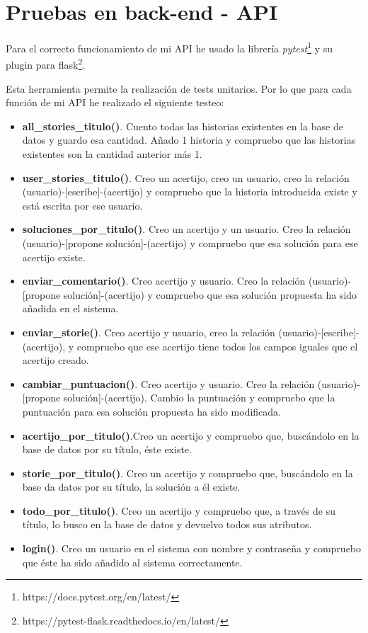 \section{Pruebas en back-end - API}

Para el correcto funcionamiento de mi API he usado la librería \textit{pytest}\footnote{https://docs.pytest.org/en/latest/} y su plugin para flask\footnote{https://pytest-flask.readthedocs.io/en/latest/}.

Esta herramienta permite la realización de tests unitarios. Por lo que para cada función de mi API he realizado el siguiente testeo:

\begin{itemize}
    \item \textbf{all\_stories\_titulo()}. Cuento todas las historias existentes en la base de datos y guardo esa cantidad. Añado 1 historia y compruebo que las historias existentes son la cantidad anterior más 1.
     \item \textbf{user\_stories\_titulo()}. Creo un acertijo, creo un usuario, creo la relación (usuario)-[escribe]-(acertijo) y compruebo que la historia introducida existe y está escrita por ese usuario.
     \item \textbf{soluciones\_por\_titulo()}. Creo un acertijo y un usuario. Creo la relación (usuario)-[propone solución]-(acertijo) y compruebo que esa solución para ese acertijo existe.
     \item \textbf{enviar\_comentario()}. Creo acertijo y usuario. Creo la relación (usuario)-[propone solución]-(acertijo) y compruebo que esa solución propuesta ha sido añadida en el sistema.
     \item \textbf{enviar\_storie()}. Creo acertijo y usuario, creo la relación (usuario)-[escribe]-(acertijo), y compruebo que ese acertijo tiene todos los campos iguales que el acertijo creado.
     \item \textbf{cambiar\_puntuacion()}. Creo acertijo y usuario. Creo la relación (usuario)-[propone solución]-(acertijo). Cambio la puntuación y compruebo que la puntuación para esa solución propuesta ha sido modificada.
     \item \textbf{acertijo\_por\_titulo()}.Creo un acertijo y compruebo que, buscándolo en la base de datos por su título, éste existe.
     \item \textbf{storie\_por\_titulo()}. Creo un acertijo y compruebo que, buscándolo en la base da datos por su título, la solución a él existe.
     \item \textbf{todo\_por\_titulo()}. Creo un acertijo y compruebo que, a través de su título, lo busco en la base de datos y devuelvo todos sus atributos.
     \item \textbf{login()}. Creo un usuario en el sistema con nombre y contraseña y compruebo que éste ha sido añadido al sistema correctamente.
\end{itemize}

